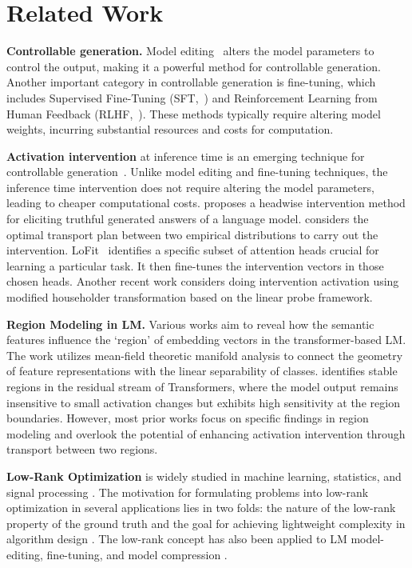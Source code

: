 \section{Related Work}
\textbf{Controllable generation.}  Model editing~\citep{ref:wang2023knowledge, ref:zhang2024comprehensive} alters the model parameters to control the output, making it a powerful method for controllable generation. Another important category in controllable generation is fine-tuning, which includes Supervised Fine-Tuning (SFT,~\citep{ref:peng2023instruction, ref:gunel2020supervised}) and Reinforcement Learning from Human Feedback (RLHF,~\citep{ref:ouyang2022training, ref:griffith2013policy}). These methods typically require altering model weights, incurring substantial resources and costs for computation.
 
\noindent \textbf{Activation intervention} at inference time is an emerging technique for controllable generation~\citep{ref:li2024inference,ref:singh2024mimic,yin2024lofit}. Unlike model editing and fine-tuning techniques, the inference time intervention does not require altering the model parameters, leading to cheaper computational costs. \citet{ref:li2024inference} proposes a headwise intervention method for eliciting truthful generated answers of a language model. \citet{ref:singh2024mimic} considers the optimal transport plan between two empirical distributions to carry out the intervention. LoFit~\citep{yin2024lofit} identifies a specific subset of attention heads crucial for learning a particular task. It then fine-tunes the intervention vectors in those chosen heads. Another recent work \citep{pham2024householder} considers doing intervention activation using modified householder transformation based on the linear probe framework. 

\noindent \textbf{Region Modeling in LM.}
Various works aim to reveal how the semantic features influence the `region' of embedding vectors in the transformer-based LM. The work \citep{mamou2020emergence} utilizes mean-field theoretic manifold analysis to connect the geometry of feature representations with the linear separability of classes. \citet{janiak2024characterizing} identifies stable regions in the residual stream of Transformers, where the model output remains insensitive to small activation changes but exhibits high sensitivity at the region boundaries. However, most prior works focus on specific findings in region modeling and overlook the potential of enhancing activation intervention through transport between two regions.

\noindent \textbf{Low-Rank Optimization} is widely studied in machine learning, statistics, and signal processing \citep{olikier2022low,zhanxuan2020low,cory2021new}. The motivation for formulating problems into low-rank optimization in several applications lies in two folds: the nature of the low-rank property of the ground truth and the goal for achieving lightweight complexity in algorithm design \citep{mcrae2024benign}.  
The low-rank concept has also been applied to LM model-editing, fine-tuning, and model compression \citep{hu2021lora,hsu2022language}.